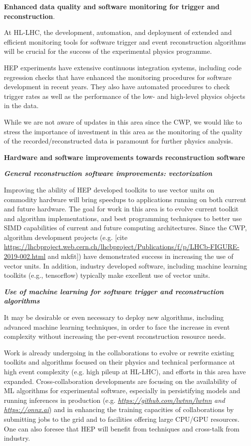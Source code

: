 \documentclass[11pt,a4paper]{article}
\begin{document}
\textbf{Enhanced data quality and software monitoring for trigger and
reconstruction}.

At HL-LHC, the development, automation, and deployment of extended and
efficient monitoring tools for software trigger and event reconstruction
algorithms will be crucial for the success of the experimental physics
programme.

HEP experiments have extensive continuous integration systems, including
code regression checks that have enhanced the monitoring procedures for
software development in recent years. They also have automated
procedures to check trigger rates as well as the performance of the low-
and high-level physics objects in the data.

While we are not aware of updates in this area since the CWP, we would
like to stress the importance of investment in this area as the
monitoring of the quality of the recorded/reconstructed data is
paramount for further physics analysis.

\textbf{Hardware and software improvements towards reconstruction
software}

\emph{\hfill\break
\textbf{General reconstruction software improvements: vectorization}}

Improving the ability of HEP developed toolkits to use vector units on
commodity hardware will bring speedups to applications running on both
current and future hardware. The goal for work in this area is to evolve
current toolkit and algorithm implementations, and best programming
techniques to better use SIMD capabilities of current and future
computing architectures. Since the CWP, algorithm development projects
(e.g. {[}cite
\url{https://lhcbproject.web.cern.ch/lhcbproject/Publications/f/p/LHCb-FIGURE-2019-002.html}
and mkfit{]}) have demonstrated success in increasing the use of vector
units. In addition, industry developed software, including machine
learning toolkits (e.g., tensorflow) typically make excellent use of
vector units.

\emph{\textbf{Use of machine learning for software trigger and
reconstruction algorithms}}

It may be desirable or even necessary to deploy new algorithms,
including advanced machine learning techniques, in order to face the
increase in event complexity without increasing the per-event
reconstruction resource needs.

Work is already undergoing in the collaborations to evolve or rewrite
existing toolkits and algorithms focused on their physics and technical
performance at high event complexity (e.g. high pileup at HL-LHC), and
efforts in this area have expanded. Cross-collaboration developments are
focusing on the availability of ML algorithms for experimental software,
especially in persistifying models and running inferences in production
(e.g.
\emph{\href{https://github.com/lwtnn/lwtnn}{{https://github.com/lwtnn/lwtnn}}
and \href{https://onnx.ai}{{https://onnx.ai}}}) and in enhancing the
training capacities of collaborations by submitting jobs to the grid and
to facilities offering large CPU/GPU resources. One can also foresee
that HEP will benefit from techniques and cross-talk from industry.
\end{document}
